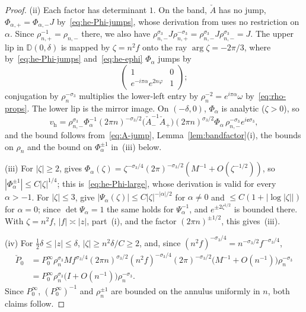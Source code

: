 \begin{proof}
(ii) Each factor has determinant $1$. On the band, $\check A$ has no jump,
$\Phi_{\alpha,+}=\Phi_{\alpha,-}J$ by~\eqref{eq:he-Phi-jumps}, whose derivation from \cite[(6.16)--(6.18)]{KMVV} uses
no restriction on $\alpha$. Since $\rho_{n,+}^{-1}=\rho_{n,-}$ there, we also have
$\rho_{n,-}^{\sigma_3}J\rho_{n,+}^{-\sigma_3}=\rho_{n,-}^{\sigma_3}J\rho_{n,-}^{\sigma_3}=J$.
The upper lip in $\mathbb D(0,\delta)$ is mapped by $\zeta=n^2f$ onto the ray $\arg\zeta=-2\pi/3$, where by~\eqref{eq:he-Phi-jumps}
and~\eqref{eq:he-ephi} $\Phi_\alpha$ jumps by
\[
  \begin{pmatrix}1&0\\e^{-i\pi\alpha}e^{2n\varphi}&1\end{pmatrix};
\]
conjugation by $\rho_n^{-\sigma_3}$ multiplies the lower-left entry by $\rho_n^{-2}=e^{i\pi\alpha}\omega$
by~\eqref{eq:rho-props}. The lower lip is the mirror image. On $(-\delta,0)$, $\Phi_\alpha$ is analytic ($\zeta>0$), so
\[
  v_{\mathrm h}=\rho_{n,-}^{\sigma_3}\Phi_\alpha^{-1}(2\pi n)^{-\sigma_3/2}\bigl(\check A_-^{-1}\check A_+\bigr)(2\pi n)^{\sigma_3/2}
  \Phi_\alpha\,\rho_{n,-}^{-\sigma_3}e^{i\mathfrak e\sigma_3},
\]
and the bound follows from~\eqref{eq:A-jump}, Lemma~\ref{lem:bandfactor}(i), the bounds on $\rho_n$ and the bound on
$\Phi_\alpha^{\pm1}$ in~(iii) below.

(iii) For $|\zeta|\ge2$, \cite[(6.28)]{KMVV} gives $\Phi_\alpha(\zeta)=\zeta^{-\sigma_3/4}(2\pi)^{-\sigma_3/2}(M^{-1}+O(\zeta^{-1/2}))$,
so $|\Phi_\alpha^{\pm1}|\le C|\zeta|^{1/4}$; this is~\eqref{eq:he-Phi-large}, whose derivation is valid for every
$\alpha>-1$. For $|\zeta|\le3$, \cite[(6.19)--(6.21)]{KMVV} give $|\Psi_\alpha(\zeta)|\le C|\zeta|^{-|\alpha|/2}$ for
$\alpha\ne0$ and $\le C(1+|\log|\zeta||)$ for $\alpha=0$; since $\det\Psi_\alpha=1$ the same holds for $\Psi_\alpha^{-1}$,
and $e^{\pm2\zeta^{1/2}}$ is bounded there. With $\zeta=n^2f$, $|f|\asymp|z|$, part~(i), and the factor
$(2\pi n)^{\pm1/2}$, this gives~(iii).

(iv) For $\frac12\delta\le|z|\le\delta$, $|\zeta|\ge n^2\delta/C\ge2$, and, since $(n^2f)^{-\sigma_3/4}=n^{-\sigma_3/2}f^{-\sigma_3/4}$,
\begin{align*}
  \check P_0&=P^\infty_0\rho_n^{\sigma_3}Mf^{\sigma_3/4}(2\pi n)^{\sigma_3/2}(n^2f)^{-\sigma_3/4}(2\pi)^{-\sigma_3/2}
  \bigl(M^{-1}+O(n^{-1})\bigr)\rho_n^{-\sigma_3}\\
  &=P^\infty_0\rho_n^{\sigma_3}\bigl(I+O(n^{-1})\bigr)\rho_n^{-\sigma_3}.
\end{align*}
Since $P^\infty_0$, $(P^\infty_0)^{-1}$ and $\rho_n^{\pm1}$ are bounded on the annulus uniformly in $n$, both claims follow.
\end{proof}


